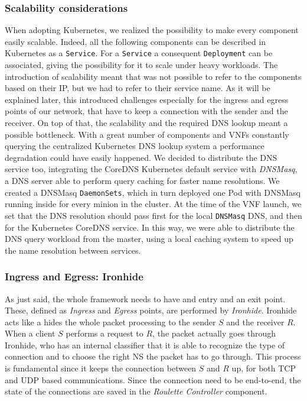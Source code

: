 \subsubsection{Scalability considerations}
When adopting Kubernetes, we realized the possibility to make every component
easily scalable. Indeed, all the following components can be described in
Kubernetes as a \verb!Service!. For a \verb!Service! a consequent
\verb!Deployment! can be associated, giving the possibility for it to scale
under heavy workloads. The introduction of scalability meant that was not
possible to refer to the components based on their IP, but we had to refer to
their service name. As it will be explained later, this introduced challenges
especially for the ingress and egress points of our network, that have to keep a
connection with the sender and the receiver. On top of that, the scalability and
the required DNS lookup meant a possible bottleneck. With a great number of
components and VNFs constantly querying the centralized Kubernetes DNS lookup
system a performance degradation could have easily happened. We decided to
distribute the DNS service too, integrating the CoreDNS Kubernetes default
service with \emph{DNSMasq}, a DNS server able to perform query caching for
faster name resolutions. We created a DNSMasq \verb!DaemonSets!, which in turn
deployed one Pod with DNSMasq running inside for every minion in the cluster. At
the time of the VNF launch, we set that the DNS resolution should pass first for
the local \verb!DNSMasq! DNS, and then for the Kubernetes CoreDNS service. In
this way, we were able to distribute the DNS query workload from the master,
using a local caching system to speed up the name resolution between services.

\subsubsection{Ingress and Egress: Ironhide}
As just said, the whole framework needs to have and entry and an exit point.
These, defined as \emph{Ingress} and \emph{Egress} points, are performed by
\emph{Ironhide}. Ironhide acts like a hides the whole packet processing to the
sender $S$ and the receiver $R$. When a client $S$ performs a request to $R$,
the packet actually goes through Ironhide, who has an internal classifier that
it is able to recognize the type of connection and to choose the right NS the
packet has to go through. This process is fundamental since it keeps the
connection between $S$ and $R$ up, for both TCP and UDP based communications.
Since the connection need to be end-to-end, the state of the connections are
saved in the \emph{Roulette Controller} component.

